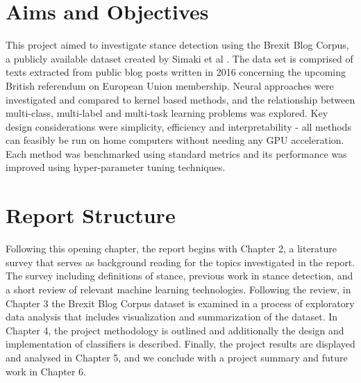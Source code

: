 \documentclass[Dissertation.tex]{subfiles}
\begin{document}
\begin{comment}
In such politically turbulent times there is significant interest in applying machine learning and natural language processing (NLP) techniques to political social media content, such as opinion mining and sentiment analysis. This project considers the related task of stance detection, which in the simplest case involves determining if a text in agreement or disagreement with a given proposition. As one of the most significant and polarizing political events in a generation, the Brexit debate is an ideal topic for investigating stance detection.
\end{comment}

\section{Aims and Objectives}
This project aimed to investigate stance detection using the Brexit Blog Corpus, a publicly available dataset created by Simaki et al \cite{simakiAnnotatingSpeakerStance2017}. The data set is comprised of texts extracted from public blog posts written in 2016 concerning the upcoming British referendum on European Union membership. Neural approaches were investigated and compared to kernel based methods, and the relationship between multi-class, multi-label and multi-task learning problems was explored. Key design considerations were simplicity, efficiency and interpretability - all methods can feasibly be run on home computers without needing any GPU acceleration. Each method was benchmarked using standard metrics and its performance was improved using hyper-parameter tuning techniques.

\section{Report Structure}
Following this opening chapter, the report begins with Chapter 2, a literature survey that serves as background reading for the topics investigated in the report. The survey including definitions of stance, previous work in stance detection, and a short review of relevant machine learning technologies. Following the review, in Chapter 3 the Brexit Blog Corpus dataset is examined in a process of exploratory data analysis that includes visualization and summarization of the dataset. In Chapter 4, the project methodology is outlined and additionally the design and implementation of classifiers is described. Finally, the project results are displayed and analysed in Chapter 5, and we conclude with a project summary and future work in Chapter 6.
\end{document}
